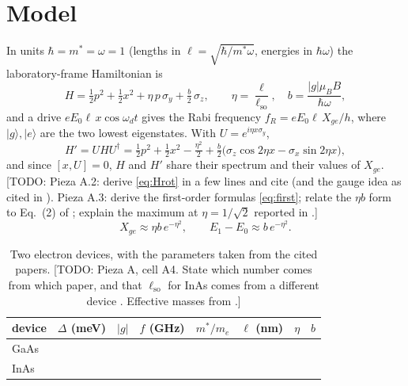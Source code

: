 \documentclass[11pt]{article}
\theoremstyle{remark}
\newcommand{\todo}[1]{\textcolor{red!70!black}{[TODO: #1]}}
\newcommand{\ket}[1]{|#1\rangle}
\newcommand{\xge}{X_{ge}}
\begin{document}
\section{Model}\label{sec:model}
In units $\hbar=m^*=\omega=1$ (lengths in $\ell=\sqrt{\hbar/m^*\omega}$, energies in $\hbar\omega$) the laboratory-frame Hamiltonian is
\begin{equation}\label{eq:H}
H=\tfrac12p^2+\tfrac12x^2+\eta\,p\,\sigma_y+\tfrac b2\,\sigma_z,\qquad \eta=\frac{\ell}{\ell_{\mathrm{so}}},\quad b=\frac{|g|\mu_BB}{\hbar\omega},
\end{equation}
and a drive $eE_0\ell\,x\cos\omega_dt$ gives the Rabi frequency $f_R=eE_0\ell\,\xge/h$, where $\ket g,\ket e$ are the two lowest eigenstates. With $U=e^{i\eta x\sigma_y}$,
\begin{equation}\label{eq:Hrot}
H'=UHU^\dagger=\tfrac12p^2+\tfrac12x^2-\tfrac{\eta^2}2+\tfrac b2\bigl(\sigma_z\cos2\eta x-\sigma_x\sin2\eta x\bigr),
\end{equation}
and since $[x,U]=0$, $H$ and $H'$ share their spectrum and their values of $\xge$.
\todo{Pieza A.2: derive \eqref{eq:Hrot} in a few lines and cite \cite{li2013} (and the gauge idea as cited in \cite{nowack2007}). Pieza A.3: derive the first-order formulas \eqref{eq:first}; relate the $\eta b$ form to Eq.~(2) of \cite{nowack2007}; explain the maximum at $\eta=1/\sqrt2$ reported in \cite{li2013}.}
\begin{equation}\label{eq:first}
\xge\approx\eta b\,e^{-\eta^2},\qquad E_1-E_0\approx b\,e^{-\eta^2}.
\end{equation}

\begin{table}[h]\centering
\caption{Two electron devices, with the parameters taken from the cited papers. \todo{Pieza A, cell A4. State which number comes from which paper, and that $\ell_{\mathrm{so}}$ for InAs comes from a different device \cite{fasth2007}. Effective masses from \cite{vurgaftman2001}.}}
\label{tab:devices}
\begin{tabular}{lccccccc}\toprule
device & $\Delta$ (meV) & $|g|$ & $f$ (GHz) & $m^*/m_e$ & $\ell$ (nm) & $\eta$ & $b$\\\midrule
GaAs \cite{nowack2007} & & & & & & & \\
InAs \cite{nadjperge2010,fasth2007} & & & & & & & \\\bottomrule
\end{tabular}\end{table}
\end{document}
